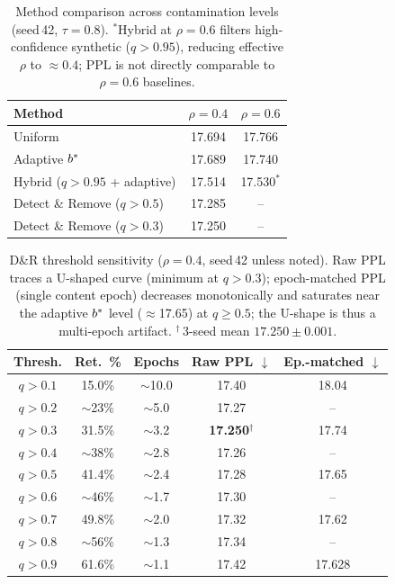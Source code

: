 \begin{table}[h]
\centering
\small
\begin{tabular}{@{}lcc@{}}
\toprule
\textbf{Method} & $\rho{=}0.4$ & $\rho{=}0.6$ \\
\midrule
Uniform & 17.694 & 17.766 \\
Adaptive $b^*$ & 17.689 & 17.740 \\
Hybrid ($q{>}0.95$ + adaptive) & 17.514 & 17.530$^*$ \\
Detect \& Remove ($q{>}0.5$) & 17.285 & -- \\
Detect \& Remove ($q{>}0.3$) & 17.250 & -- \\
\bottomrule
\end{tabular}
\caption{Method comparison across contamination levels (seed\,42, $\tau{=}0.8$).
$^*$Hybrid at $\rho{=}0.6$ filters high-confidence synthetic ($q{>}0.95$), reducing effective $\rho$ to ${\approx}0.4$; PPL is not directly comparable to $\rho{=}0.6$ baselines.}
\label{tab:hybrid}
\end{table}

\begin{table}[h]
\centering
\small
\setlength{\tabcolsep}{3pt}
\begin{tabular}{@{}ccccc@{}}
\toprule
\textbf{Thresh.} & \textbf{Ret.\ \%} & \textbf{Epochs} & \textbf{Raw PPL} $\downarrow$ & \textbf{Ep.-matched} $\downarrow$ \\
\midrule
$q > 0.1$ & 15.0\% & ${\sim}$10.0 & 17.40 & 18.04 \\
$q > 0.2$ & ${\sim}$23\% & ${\sim}$5.0 & 17.27 & -- \\
$q > 0.3$ & 31.5\% & ${\sim}$3.2 & \textbf{17.250}$^\dagger$ & 17.74 \\
$q > 0.4$ & ${\sim}$38\% & ${\sim}$2.8 & 17.26 & -- \\
$q > 0.5$ & 41.4\% & ${\sim}$2.4 & 17.28 & 17.65 \\
$q > 0.6$ & ${\sim}$46\% & ${\sim}$1.7 & 17.30 & -- \\
$q > 0.7$ & 49.8\% & ${\sim}$2.0 & 17.32 & 17.62 \\
$q > 0.8$ & ${\sim}$56\% & ${\sim}$1.3 & 17.34 & -- \\
$q > 0.9$ & 61.6\% & ${\sim}$1.1 & 17.42 & 17.628 \\
\bottomrule
\end{tabular}
\caption{D\&R threshold sensitivity ($\rho{=}0.4$, seed\,42 unless noted).
Raw PPL traces a U-shaped curve (minimum at $q{>}0.3$); epoch-matched PPL (single content epoch) decreases monotonically and saturates near the adaptive $b^*$ level (${\approx}$17.65) at $q{\geq}0.5$; the U-shape is thus a multi-epoch artifact.
$^\dagger$\,3-seed mean $17.250 \pm 0.001$.}
\label{tab:dr_threshold}
\end{table}


